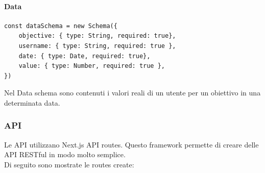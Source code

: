 \paragraph{Data}

\begin{verbatim}
const dataSchema = new Schema({
    objective: { type: String, required: true},
    username: { type: String, required: true },
    date: { type: Date, required: true},
    value: { type: Number, required: true },
})
\end{verbatim}

Nel Data schema sono contenuti i valori reali di un utente per un obiettivo in una determinata data.

\subsubsection{API}

Le API utilizzano Next.js API routes. Questo framework permette di creare delle API RESTful in modo molto semplice.\\

Di seguito sono mostrate le routes create:

